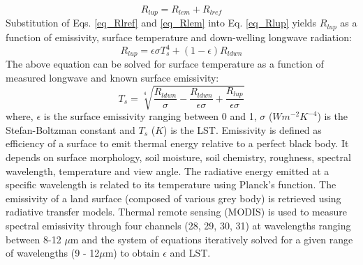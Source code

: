 \documentclass[fleqn,10pt]{wlscirep}
\begin{document}
\begin{equation}\label{eq_Rlup}
R_{lup} = R_{lem} + R_{lref}
\end{equation}
Substitution of Eqs. \ref{eq_Rlref} and \ref{eq_Rlem} into Eq. \ref{eq_Rlup} yields $R_{lup}$ as a function of emissivity, surface temperature and down-welling longwave radiation:
\begin{equation}\label{eq_leq}
R_{lup}= \epsilon \sigma T_{s}^{4} + (1- \epsilon)R_{ldwn}
\end{equation}
The above equation can be solved for surface temperature as a function of measured longwave and known surface emissivity:
\begin{equation}\label{eq_Tleq}
T_{s} = \sqrt[4]{\frac{R_{ldwn}}{\sigma} - \frac{R_{ldwn}}{\epsilon \sigma} + \frac{R_{lup}}{\epsilon \sigma}}
\end{equation}
where, $\epsilon$ is the surface emissivity ranging between 0 and 1, $\sigma$ ($Wm^{-2}K^{-4}$) is the Stefan-Boltzman constant and $T_{s}$ ($K$) is the LST. %
Emissivity is defined as efficiency of a surface to emit thermal energy relative to a perfect black body. It  depends on surface morphology, soil moisture, soil chemistry, roughness, spectral wavelength, temperature and view angle\cite{norman1995terminology}. %
The radiative energy  emitted at a specific wavelength is related to its temperature using Planck's function\cite{wang_estimation_2005-1}. The emissivity of a land surface (composed of various grey body) is retrieved  using radiative transfer models\cite{hulley_quantifying_2012-1,jin2006improved,wang_evaluation_2009}. Thermal remote sensing (MODIS) is used to measure spectral emissivity through four channels (28, 29, 30, 31) at wavelengths ranging between 8-12 $\mu$m \cite{jin_improved_2006-1} and the system of equations iteratively solved for a given range of wavelengths (9 - 12$\mu$m) to obtain $\epsilon$ and LST.
\end{document}
